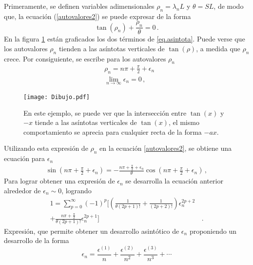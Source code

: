 Primeramente, se definen  variables adimensionales $\rho _n = \lambda _n L $ y $\theta = S L $, de modo que, la ecuación (\ref{autovalores2}) se puede expresar de la forma
\begin{equation}
    \tan (\rho _n) + \frac{\rho _n}{\theta} = 0
    \, .
    \label{eq.asintota}
\end{equation}
En la figura \ref{fig:Dibujo1} están graficados los dos términos de \ref{eq.asintota}. Puede verse que los autovalores $\rho _n$ tienden a las asíntotas verticales de $ \tan ( \rho ) $, a medida que $\rho _n$ crece. Por consiguiente, se escribe para los autovalores $\rho _n$ 
\begin{align}
    & \rho _n = n \pi + \frac{\pi}{2} + \epsilon _n 
\label{eq.mu}    
\\[5pt]
\nonumber
    & \lim \limits_{ n \rightarrow \infty} \epsilon _n = 0
\, ,
\end{align}
\begin{figure}
    \centering
    \texttt{[image: Dibujo.pdf]}
    \caption{En este ejemplo, se puede ver que la intersección entre $ \tan(x)$ y $-x$ tiende a las asíntotas verticales de $\tan (x) $, el mismo comportamiento se aprecia para cualquier recta de la forma $- a x$.}
    \label{fig:Dibujo1}
\end{figure}
Utilizando esta expresión de $\rho _n$ en la ecuación \eqref{autovalores2}, se obtiene una ecuación para $\epsilon _n$
\begin{equation}
\begin{aligned}
    \sin \left( n \pi + \frac{\pi}{2} + \epsilon _n \right) = -
    \frac{n \pi + \frac{\pi}{2} + \epsilon _n}{\theta} \cos \left( n \pi + \frac{\pi}{2} + \epsilon _n\right)
    \, ,
\end{aligned}
\end{equation}
Para lograr obtener una expresión de $\epsilon _n$ se desarrolla la ecuación anterior alrededor de $\epsilon  _n \sim 0$, logrando
\begin{align}
\nonumber
    1 =     
    \sum _{p=0} ^{\infty} (-1) ^p    
    \Bigg[
   	\left( \frac{1}{\theta (2p+1)!  } + \frac{1}{(2p+2)!} \right) 			\epsilon _n ^{2p+2 } 
&   	
\\
\label{igualdad epsilon}
  	+ \frac{n \pi + \frac{\pi}{2}}{\theta (2p+1)! }   \epsilon _n ^{2p
  	+1}	\Bigg]
& 
  	\, .
\end{align}
Expresión, que permite obtener un desarrollo asintótico de $\epsilon _n$  proponiendo un desarrollo de la forma
\begin{equation}
\label{eq.epsilon}
    \epsilon _n = 
    \frac{\epsilon ^{(1)}}{n}  + 
    \frac{\epsilon ^{(2)}}{n ^2}  + 
    \frac{\epsilon ^{(3)}}{n ^3}  + \dotsb
\end{equation}
